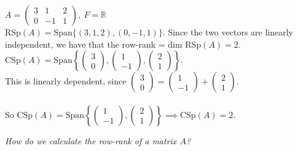 \documentclass[twoside]{scrartcl}
\begin{document}
\begin{example}
$A = \begin{pmatrix}
 3 & 1 & 2\\
 0 & -1 & 1
 \end{pmatrix},~ F = \mathbb{R}$\\
 
 $\text{RSp}(A) = \text{Span}\{(3,1,2),(0,-1,1)\}$. Since the two vectors are linearly independent, we have that the row-rank = dim $\text{RSp}(A) = 2$.\\
 
 $\text{CSp}(A) = \text{Span}\left\{
 \begin{pmatrix}
 3\\0 
 \end{pmatrix}, 
 \begin{pmatrix}
 1 \\ -1
 \end{pmatrix},
 \begin{pmatrix}
 2\\1
 \end{pmatrix}
\right\}$. \\

This is linearly dependent, since $
\begin{pmatrix}
3\\0
\end{pmatrix}
= 
\begin{pmatrix}
1\\-1
\end{pmatrix}
+ \begin{pmatrix}
 2\\1
 \end{pmatrix}
$.\\~\\

So $\text{CSp}(A) = \text{Span}\left\{
\begin{pmatrix}
 1 \\ -1
 \end{pmatrix},
 \begin{pmatrix}
 2\\1
 \end{pmatrix}
\right\} \implies \text{CSp}(A) = 2.$
\end{example}



\textit{How do we calculate the row-rank of a matrix $A$?}\\
\end{document}
